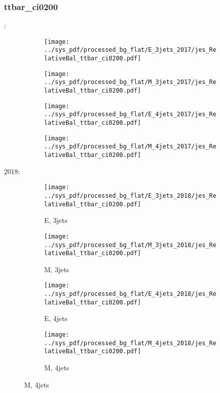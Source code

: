 \documentclass{beamer}
\begin{document}
\begin{frame}
\frametitle{ttbar_ci0200}
\fontsize{5}{1}:
\begin{figure}
\centering
\begin{subfigure}[b]{0.24\textwidth}
\texttt{[image: ../sys\_pdf/processed\_bg\_flat/E\_3jets\_2017/jes\_RelativeBal\_ttbar\_ci0200.pdf]}
\end{subfigure}
\begin{subfigure}[b]{0.24\textwidth}
\texttt{[image: ../sys\_pdf/processed\_bg\_flat/M\_3jets\_2017/jes\_RelativeBal\_ttbar\_ci0200.pdf]}
\end{subfigure}
\begin{subfigure}[b]{0.24\textwidth}
\texttt{[image: ../sys\_pdf/processed\_bg\_flat/E\_4jets\_2017/jes\_RelativeBal\_ttbar\_ci0200.pdf]}
\end{subfigure}
\begin{subfigure}[b]{0.24\textwidth}
\texttt{[image: ../sys\_pdf/processed\_bg\_flat/M\_4jets\_2017/jes\_RelativeBal\_ttbar\_ci0200.pdf]}
\end{subfigure}
\end{figure}
2018:
\begin{figure}
\centering
\begin{subfigure}[b]{0.24\textwidth}
\texttt{[image: ../sys\_pdf/processed\_bg\_flat/E\_3jets\_2018/jes\_RelativeBal\_ttbar\_ci0200.pdf]}
\captionsetup{font=tiny}
\caption{E, 3jets}
\end{subfigure}
\begin{subfigure}[b]{0.24\textwidth}
\texttt{[image: ../sys\_pdf/processed\_bg\_flat/M\_3jets\_2018/jes\_RelativeBal\_ttbar\_ci0200.pdf]}
\captionsetup{font=tiny}
\caption{M, 3jets}
\end{subfigure}
\begin{subfigure}[b]{0.24\textwidth}
\texttt{[image: ../sys\_pdf/processed\_bg\_flat/E\_4jets\_2018/jes\_RelativeBal\_ttbar\_ci0200.pdf]}
\captionsetup{font=tiny}
\caption{E, 4jets}
\end{subfigure}
\begin{subfigure}[b]{0.24\textwidth}
\texttt{[image: ../sys\_pdf/processed\_bg\_flat/M\_4jets\_2018/jes\_RelativeBal\_ttbar\_ci0200.pdf]}
\captionsetup{font=tiny}
\caption{M, 4jets}
\end{subfigure}
\end{figure}
\end{frame}
\end{document}
